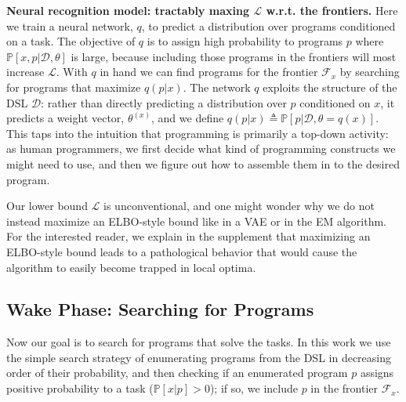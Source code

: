 \documentclass{article}
\newcommand{\lowerBound}{\mathscr{L}}
\newcommand{\probability}{\mathds{P}} %
\begin{document}
\textbf{Neural recognition model: tractably maxing $\lowerBound$ w.r.t. the
  frontiers.}  Here we train a neural network, $q$, to predict a
distribution over programs conditioned on a task. The objective of $q$
is to assign high probability to programs $p$ where
$\probability[x,p|\mathcal{D},\theta]$ is large, because including those programs
in the frontiers will most increase $\lowerBound$.  With $q$ in hand we can find programs for
the frontier $\mathcal{F}_x$ by searching for programs that maximize
$q(p|x)$.
The network $q$ exploits the structure of the DSL $\mathcal{D}$:
rather than directly predicting a distribution over $p$ conditioned on $x$,
it predicts a weight vector, $\theta^{(x)}$, and we define $q(p|x)\triangleq \probability[p|\mathcal{D},\theta = q(x)]$.
This taps into the intuition that programming is primarily a top-down activity:
as human programmers, we first decide what kind of
programming constructs we might need to use,
and then we figure out how to assemble them in to the desired program.

Our lower bound $\lowerBound$ is unconventional,
and one might wonder why we do not instead maximize an ELBO-style bound like in a VAE or in the EM algorithm.
For the interested reader, we explain in the supplement that maximizing an ELBO-style bound
leads to a pathological behavior that would cause the algorithm to easily become trapped in local optima.





\subsection{Wake Phase: Searching for Programs}\label{explorationSection}

Now our goal is to search for programs that solve the tasks.  In this
work we use the simple search strategy of enumerating programs from
the DSL  in decreasing order of their probability,
and then checking if an enumerated program $p$ assigns positive
probability to a task ($\probability[x|p] > 0$); if so, we include $p$ in
the frontier $\mathcal{F}_x$.
\end{document}
